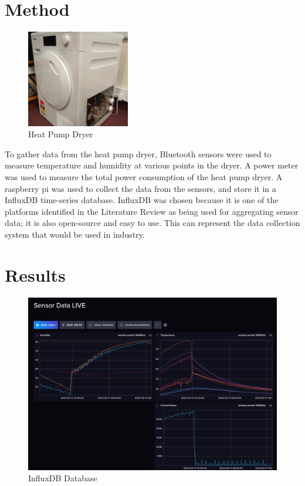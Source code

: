 \documentclass[12pt]{report}
\begin{document}
\section{Method}

\begin{figure}
    \centering
    \includegraphics[width=0.4\textwidth]{dryer.png}
    \caption{Heat Pump Dryer}
    \label{fig:dryer}
\end{figure}

To gather data from the heat pump dryer, Bluetooth sensors were used to measure temperature and humidity at various points in the dryer. A power meter was used to measure the total power consumption of the heat pump dryer. A raspberry pi was used to collect the data from the sensors, and store it in a InfluxDB time-series database. InfluxDB was chosen because it is one of the platforms identified in the Literature Review as being used for aggregating sensor data; it is also open-source and easy to use. This can represent the data collection system that would be used in industry.

\section{Results}

\begin{figure}
    \centering
    \includegraphics[width=\textwidth]{influxdb.png}
    \caption{InfluxDB Database}
    \label{fig:influxdb}
\end{figure}
\end{document}

